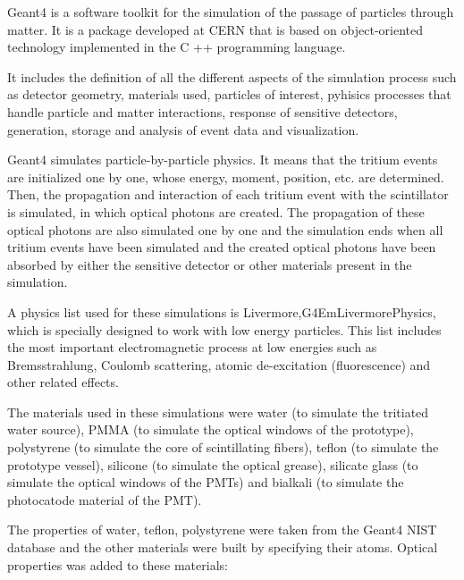 Geant4 is a software toolkit for the simulation of the passage of particles through matter. It is a package developed at CERN that is based on object-oriented technology implemented in the C ++ programming language.

It includes the definition of all the different aspects of the simulation process such as detector geometry, materials used, particles of interest, pyhisics processes that handle particle and matter interactions, response of sensitive detectors, generation, storage and analysis of event data and visualization.

Geant4 simulates particle-by-particle physics. It means that the tritium events are initialized one by one, whose energy, moment, position, etc. are determined. Then, the propagation and interaction of each tritium event with the scintillator is simulated, in which optical photons are created. The propagation of these optical photons are also simulated one by one and the simulation ends when all tritium events have been simulated and the created optical photons have been absorbed by either the sensitive detector or other materials present in the simulation.

A physics list used for these simulations is Livermore,\newline G4EmLivermorePhysics, which is specially designed to work with low energy particles. This list includes the most important electromagnetic process at low energies such as Bremsstrahlung, Coulomb scattering, atomic de-excitation (fluorescence) and other related effects.

The materials used in these simulations were water (to simulate the tritiated water source), PMMA (to simulate the optical windows of the prototype), polystyrene (to simulate the core of scintillating fibers), teflon (to simulate the prototype vessel), silicone (to simulate the optical grease), silicate glass (to simulate the optical windows of the PMTs) and bialkali (to simulate the photocatode material of the PMT).

The properties of water, teflon, polystyrene were taken from the Geant4 NIST database and the other materials were built by specifying their atoms. Optical properties was added to these materials:


